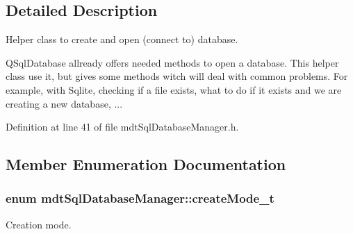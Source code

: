 \subsection{Detailed Description}
Helper class to create and open (connect to) database. 

Q\-Sql\-Database allready offers needed methods to open a database. This helper class use it, but gives some methods witch will deal with common problems. For example, with Sqlite, checking if a file exists, what to do if it exists and we are creating a new database, ... 

Definition at line 41 of file mdt\-Sql\-Database\-Manager.\-h.



\subsection{Member Enumeration Documentation}
\hypertarget{classmdt_sql_database_manager_a2f5b46d67a88095053a5edfc415c7418}{
\subsubsection[{create\-Mode\-\_\-t}]{\setlength{\rightskip}{0pt plus 5cm}enum {\bf mdt\-Sql\-Database\-Manager\-::create\-Mode\-\_\-t}}}\label{classmdt_sql_database_manager_a2f5b46d67a88095053a5edfc415c7418}


Creation mode. 


